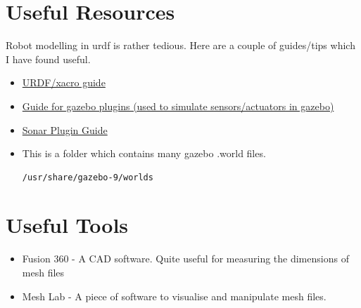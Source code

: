 \documentclass[11pt]{article}
\begin{document}
\tableofcontents

\section{Useful Resources}
Robot modelling in urdf is rather tedious. Here are a couple of guides/tips which I have found useful.


\begin{itemize}
 \item {
       \href{https://nu-msr.github.io/me495_site/lecture06_modeling.html}{URDF/xacro guide}
       }
 \item{
       \href{   https://classic.gazebosim.org/tutorials?tut=ros_gzplugins}{Guide for gazebo plugins (used to simulate sensors/actuators in gazebo)}
       }
 \item{
       \href{
        https://medium.com/teamarimac/integrating-sonar-and-ir-sensor-plugin-to-robot-model-in-gazebo-with-ros-656fd9452607
       }{Sonar Plugin Guide}
       }
 \item{
       This is a folder which contains many gazebo .world files.
       \begin{lstlisting}[language=bash]
        /usr/share/gazebo-9/worlds
       \end{lstlisting}
       }
       
\end{itemize}
\section{Useful Tools}
\begin{itemize}
 \item {Fusion 360 - A CAD software. Quite useful for measuring the dimensions of mesh files }
 \item { Mesh Lab - A piece of software to visualise and manipulate mesh files.}
\end{itemize}
\end{document}
